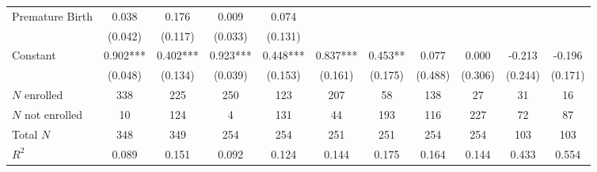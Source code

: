\begin{tabular}{lcccccccccc}
Premature Birth & 0.038 & 0.176 & 0.009 & 0.074 &  &  &  &  &  &  \\
 & (0.042) & (0.117) & (0.033) & (0.131) &  &  &  &  &  &  \\
Constant & 0.902*** & 0.402*** & 0.923*** & 0.448*** & 0.837*** & 0.453** & 0.077 & 0.000 & -0.213 & -0.196 \\
 & (0.048) & (0.134) & (0.039) & (0.153) & (0.161) & (0.175) & (0.488) & (0.306) & (0.244) & (0.171) \\
\midrule
$N$ enrolled & 338 & 225 & 250 & 123 & 207 & 58 & 138 & 27 & 31 & 16 \\
$N$ not enrolled & 10 & 124 & 4 &131 & 44 & 193 & 116 & 227 & 72 & 87  \\
Total $N$ & 348 & 349 & 254 & 254 & 251 & 251 & 254 & 254 & 103 & 103 \\
$R^2$ & 0.089 & 0.151 & 0.092 & 0.124 & 0.144 & 0.175 & 0.164 & 0.144 & 0.433 & 0.554 \\ \bottomrule
\end{tabular}
